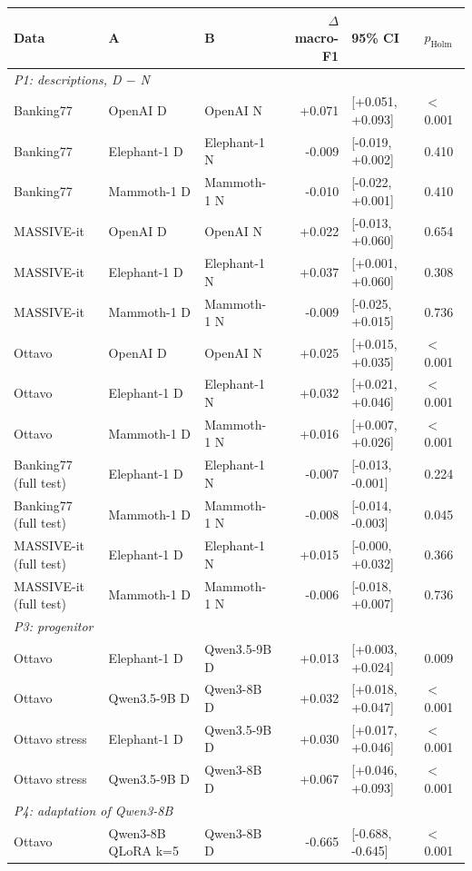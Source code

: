 \begin{tabular}{lllrll}
\toprule
Data & A & B & $\Delta$ macro-F1 & 95\% CI & $p_{\mathrm{Holm}}$ \\
\midrule
\multicolumn{6}{l}{\textit{P1: descriptions, D $-$ N}} \\
Banking77 & OpenAI D & OpenAI N & +0.071 & [+0.051, +0.093] & $<$0.001 \\
Banking77 & Elephant-1 D & Elephant-1 N & -0.009 & [-0.019, +0.002] & 0.410 \\
Banking77 & Mammoth-1 D & Mammoth-1 N & -0.010 & [-0.022, +0.001] & 0.410 \\
MASSIVE-it & OpenAI D & OpenAI N & +0.022 & [-0.013, +0.060] & 0.654 \\
MASSIVE-it & Elephant-1 D & Elephant-1 N & +0.037 & [+0.001, +0.060] & 0.308 \\
MASSIVE-it & Mammoth-1 D & Mammoth-1 N & -0.009 & [-0.025, +0.015] & 0.736 \\
Ottavo & OpenAI D & OpenAI N & +0.025 & [+0.015, +0.035] & $<$0.001 \\
Ottavo & Elephant-1 D & Elephant-1 N & +0.032 & [+0.021, +0.046] & $<$0.001 \\
Ottavo & Mammoth-1 D & Mammoth-1 N & +0.016 & [+0.007, +0.026] & $<$0.001 \\
Banking77 (full test) & Elephant-1 D & Elephant-1 N & -0.007 & [-0.013, -0.001] & 0.224 \\
Banking77 (full test) & Mammoth-1 D & Mammoth-1 N & -0.008 & [-0.014, -0.003] & 0.045 \\
MASSIVE-it (full test) & Elephant-1 D & Elephant-1 N & +0.015 & [-0.000, +0.032] & 0.366 \\
MASSIVE-it (full test) & Mammoth-1 D & Mammoth-1 N & -0.006 & [-0.018, +0.007] & 0.736 \\
\midrule
\multicolumn{6}{l}{\textit{P3: progenitor}} \\
Ottavo & Elephant-1 D & Qwen3.5-9B D & +0.013 & [+0.003, +0.024] & 0.009 \\
Ottavo & Qwen3.5-9B D & Qwen3-8B D & +0.032 & [+0.018, +0.047] & $<$0.001 \\
Ottavo stress & Elephant-1 D & Qwen3.5-9B D & +0.030 & [+0.017, +0.046] & $<$0.001 \\
Ottavo stress & Qwen3.5-9B D & Qwen3-8B D & +0.067 & [+0.046, +0.093] & $<$0.001 \\
\midrule
\multicolumn{6}{l}{\textit{P4: adaptation of Qwen3-8B}} \\
Ottavo & Qwen3-8B QLoRA k=5 & Qwen3-8B D & -0.665 & [-0.688, -0.645] & $<$0.001 \\

\end{tabular}
